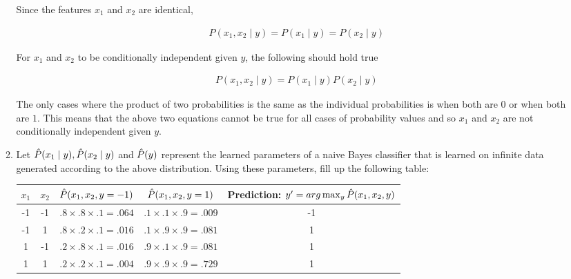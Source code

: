 \begin{enumerate}
\begin{enumerate}
Since the features $x_1$ and $x_2$ are identical,
    
\begin{equation*}
\begin{aligned}
P(x_1,x_2 \mid y) = P(x_1 \mid y) = P(x_2 \mid y)
\end{aligned}
\end{equation*} 

For $x_1$ and $x_2$ to be conditionally independent given $y$, the following should hold true

\begin{equation*}
\begin{aligned}
P(x_1,x_2 \mid y) = P(x_1 \mid y) P(x_2 \mid y)
\end{aligned}
\end{equation*} 

The only cases where the product of two probabilities is the same as the individual probabilities is when both are $0$ or when both are $1$. This means that the above two equations cannot be true for all cases of probability values and so $x_1$ and $x_2$ are not conditionally independent given $y$.
    
  \item \relax[8 points] Let $\hat{P}(x_1 \mid y), \hat{P}(x_2 \mid y)$ and
    $\hat{P}(y)$ represent the learned parameters of a naive Bayes
    classifier that is learned on infinite data generated according to
    the above distribution. Using these parameters, fill up the
    following table:


    \begin{tabular}{|c|c|c|c|c|}
      \hline
      $x_1$ & $x_2$ & $\hat{P}(x_1, x_2, y= -1)$ & $\hat{P}(x_1, x_2, y=1)$ & {\bf Prediction: $y' = arg\max_y \hat{P}(x_1, x_2, y)$} \\
      \hline
      -1    & -1    &    $.8 \times .8 \times .1= .064$                    & $.1 \times .1 \times .9 =.009$                     &    -1                                               \\
      -1    & 1     &      $.8 \times .2 \times .1= .016$                   &  $.1 \times .9 \times .9 =.081$                     &     1                                              \\
      1     & -1    &      $.2 \times .8 \times .1= .016$                  &   $.9 \times .1 \times .9 =.081$                    &      1                                             \\
      1     & 1     &      $.2 \times .2 \times .1= .004$                  &   $.9 \times .9 \times .9 =.729$                    &       1                                            \\
      \hline
    \end{tabular}


\end{enumerate}
\end{enumerate}
